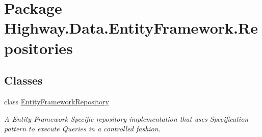 \hypertarget{namespace_highway_1_1_data_1_1_entity_framework_1_1_repositories}{\section{Package Highway.\-Data.\-Entity\-Framework.\-Repositories}
\label{namespace_highway_1_1_data_1_1_entity_framework_1_1_repositories}
}
\subsection*{Classes}
\begin{DoxyCompactItemize}
\item 
class \hyperlink{class_highway_1_1_data_1_1_entity_framework_1_1_repositories_1_1_entity_framework_repository}{Entity\-Framework\-Repository}
\begin{DoxyCompactList}\small\item\em A Entity Framework Specific repository implementation that uses Specification pattern to execute Queries in a controlled fashion. \end{DoxyCompactList}\end{DoxyCompactItemize}
